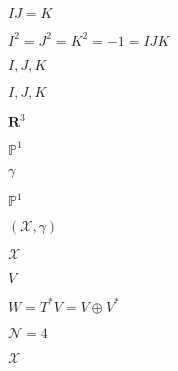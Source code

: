 \begin{preview}
\setcounter{equation}{0}%
\( IJ = K \)
\end{preview}

\begin{preview}
\setcounter{equation}{0}%
\( I^2 = J^2 = K^2 = -1 = IJK \)
\end{preview}

\begin{preview}
\setcounter{equation}{0}%
\( I,J,K \)
\end{preview}

\begin{preview}
\setcounter{equation}{0}%
\( I,J,K \)
\end{preview}

\begin{preview}
\setcounter{equation}{0}%
\( \mathbf{R}^3 \)
\end{preview}

\begin{preview}
\setcounter{equation}{0}%
\( \mathbb{P}^1 \)
\end{preview}

\begin{preview}
\setcounter{equation}{0}%
\( \gamma \)
\end{preview}

\begin{preview}
\setcounter{equation}{0}%
\( \mathbb{P}^1 \)
\end{preview}

\begin{preview}
\setcounter{equation}{0}%
\(( \mathcal{X}, \gamma )\)
\end{preview}

\begin{preview}
\setcounter{equation}{0}%
\( \mathcal{X} \)
\end{preview}

\begin{preview}
\setcounter{equation}{0}%
\( V \)
\end{preview}

\begin{preview}
\setcounter{equation}{0}%
\( W = T^{*}V = V \oplus V^{*} \)
\end{preview}

\begin{preview}
\setcounter{equation}{0}%
\( \mathcal{N}=4 \)
\end{preview}

\begin{preview}
\setcounter{equation}{0}%
\( \mathcal{X} \)
\end{preview}

